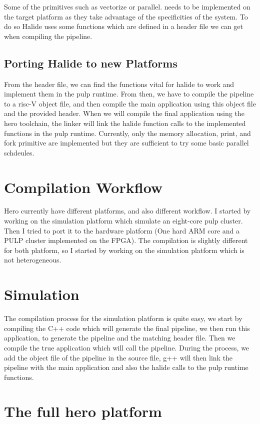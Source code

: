 	Some of the primitives such as vectorize or parallel. needs to be implemented on the target platform as they take advantage of the specificities of the system. To do so Halide uses some functions which are defined in a header file we can get when compiling the pipeline.

	\subsection { Porting Halide to new Platforms}
		From the header file, we can find the functions vital for halide to work and implement them in the pulp runtime. From then, we have to compile the pipeline to a risc-V object file, and then compile the main application using this object file and the provided header. When we will compile the final application using the hero toolchain, the linker will link the halide function calls to the implemented functions in the pulp runtime.
		Currently, only the memory allocation, print, and fork primitive are implemented but they are sufficient to try some basic parallel schdeules.

\section{Compilation Workflow}
	Hero currently have different platforms, and also different workflow. I started by working on the simulation platform which simulate an eight-core pulp cluster. Then I tried to port it to the hardware platform (One hard ARM core and a PULP cluster implemented on the FPGA). The compilation is slightly different for both platform, so I started by working on the simulation platform which is not heterogeneous.
\section{Simulation}
	The compilation process for the simulation platform is quite easy,  we start by compiling the C++ code which will generate the final pipeline, we then run this application, to generate the pipeline and the matching header file.
	Then we compile the true application which will call the pipeline. During the process, we add the object file of the pipeline in the source file, g++ will then link the pipeline with the main application and also the halide calls to the pulp runtime functions.
		
\section{The full hero platform}

